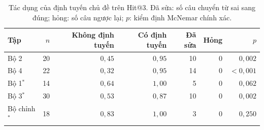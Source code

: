 \begin{table}[H]
\centering
\caption{Tác dụng của định tuyến chủ đề trên Hit@3. Đã sửa: số câu chuyển từ sai sang đúng; hỏng: số câu ngược lại; $p$: kiểm định McNemar chính xác.}\label{tab:rag-routing}
\small
\begin{tabular}{lrrrrrr}
\toprule
Tập & $n$ & Không định tuyến & Có định tuyến & Đã sửa & Hỏng & $p$ \\
\midrule
Bộ 2 & 20 & $0{,}45$ & $0{,}95$ & 10 & 0 & $0{,}002$ \\
Bộ 4 & 22 & $0{,}32$ & $0{,}95$ & 14 & 0 & $<0{,}001$ \\
Bộ 1$^{*}$ & 14 & $0{,}64$ & $1{,}00$ & 5 & 0 & $0{,}062$ \\
Bộ 3$^{*}$ & 30 & $0{,}53$ & $0{,}87$ & 10 & 0 & $0{,}002$ \\
Bộ chỉnh$^{*}$ & 18 & $0{,}83$ & $1{,}00$ & 3 & 0 & $0{,}250$ \\
\bottomrule
\end{tabular}
\end{table}
